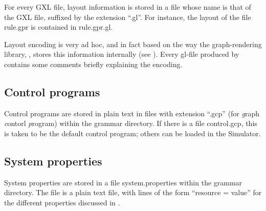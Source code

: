 For every GXL file, layout information is stored in a file whose name is that
of the GXL file, suffixed by the extension ``\textsf{.gl}''. For instance, the
layout of the file \textsf{rule.gpr} is contained in \textsf{rule.gpr.gl}.

Layout encoding is very ad hoc, and in fact based on the way the
graph-rendering library, \JGraph, stores this information internally (see
\cite{JGraph}). Every \textsf{gl}-file produced by \Groove{} contains some
comments briefly explaining the encoding.

\subsection{Control programs}

Control programs are stored in plain text in files with extension
``\textsf{.gcp}'' (for \emph{g}raph \emph{c}ontorl \emph{p}rogram) within the
grammar directory. If there is a file \textsf{control.gcp}, this is taken to be
the default control program; others can be loaded in the Simulator.

\subsection{System properties}

System properties are stored in a file \textsf{system.properties} within the
grammar directory. The file is a plain text file, with lines of the form
``\textsf{resource = value}'' for the different properties discussed in
.
